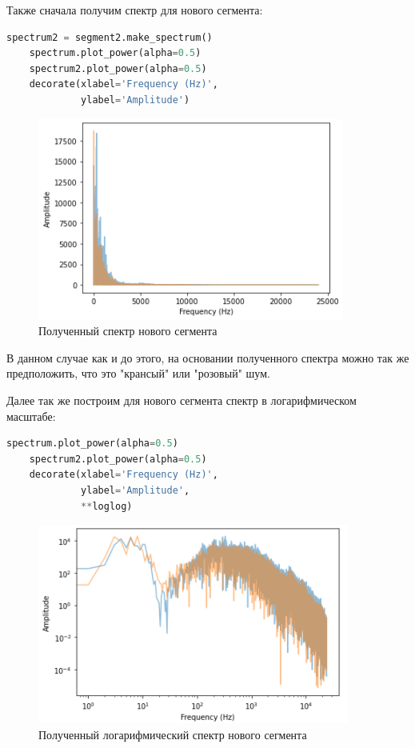 \documentclass[a4paper]{article}
\begin{document}
            Также сначала получим спектр для нового сегмента:
            
\begin{lstlisting}[language=Python, caption= Получение спектра нового сегмента]
    spectrum2 = segment2.make_spectrum()
    spectrum.plot_power(alpha=0.5)
    spectrum2.plot_power(alpha=0.5)
    decorate(xlabel='Frequency (Hz)',
             ylabel='Amplitude')
\end{lstlisting}               
            
            \begin{figure}[H]
                \centering
                \includegraphics{ex_1_wave_second_spectr.png}
                \caption{Полученный спектр нового сегмента}
                \label{fig:ex_1_rain_spectr}
            \end{figure}
            
            В данном случае как и до этого, на основании полученного спектра можно так же предположить, что это "крансый" или "розовый" шум.
            
            Далее так же построим для нового сегмента спектр в логарифмическом масштабе:
            
\begin{lstlisting}[language=Python, caption= Получение логарифмического спектра нового сегмента]
    spectrum.plot_power(alpha=0.5)
    spectrum2.plot_power(alpha=0.5)
    decorate(xlabel='Frequency (Hz)',
             ylabel='Amplitude',
             **loglog)
\end{lstlisting}               
            
            \begin{figure}[H]
                \centering
                \includegraphics{ex_1_wave_second_log_spectr.png}
                \caption{Полученный логарифмический спектр нового сегмента}
                \label{fig:ex_1_wave_second_log_spectr}
            \end{figure}
            
\end{document}
